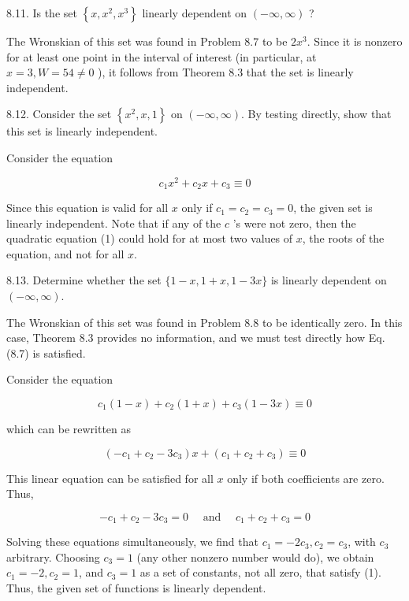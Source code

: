 \documentclass[10pt]{article}
\begin{document}
8.11. Is the set $\left\{x, x^{2}, x^{3}\right\}$ linearly dependent on $(-\infty, \infty)$ ?

The Wronskian of this set was found in Problem 8.7 to be $2 x^{3}$. Since it is nonzero for at least one point in the interval of interest (in particular, at $x=3, W=54 \neq 0$ ), it follows from Theorem 8.3 that the set is linearly independent.

8.12. Consider the set $\left\{x^{2}, x, 1\right\}$ on $(-\infty, \infty)$. By testing directly, show that this set is linearly independent.

Consider the equation


\begin{equation*}
c_{1} x^{2}+c_{2} x+c_{3} \equiv 0 \tag{1}
\end{equation*}


Since this equation is valid for all $x$ only if $c_{1}=c_{2}=c_{3}=0$, the given set is linearly independent. Note that if any of the $c$ 's were not zero, then the quadratic equation (1) could hold for at most two values of $x$, the roots of the equation, and not for all $x$.

8.13. Determine whether the set $\{1-x, 1+x, 1-3 x\}$ is linearly dependent on $(-\infty, \infty)$.

The Wronskian of this set was found in Problem 8.8 to be identically zero. In this case, Theorem 8.3 provides no information, and we must test directly how Eq. (8.7) is satisfied.

Consider the equation


\begin{equation*}
c_{1}(1-x)+c_{2}(1+x)+c_{3}(1-3 x) \equiv 0 \tag{1}
\end{equation*}


which can be rewritten as

$$
\left(-c_{1}+c_{2}-3 c_{3}\right) x+\left(c_{1}+c_{2}+c_{3}\right) \equiv 0
$$

This linear equation can be satisfied for all $x$ only if both coefficients are zero. Thus,

$$
-c_{1}+c_{2}-3 c_{3}=0 \quad \text { and } \quad c_{1}+c_{2}+c_{3}=0
$$

Solving these equations simultaneously, we find that $c_{1}=-2 c_{3}, c_{2}=c_{3}$, with $c_{3}$ arbitrary. Choosing $c_{3}=1$ (any other nonzero number would do), we obtain $c_{1}=-2, c_{2}=1$, and $c_{3}=1$ as a set of constants, not all zero, that satisfy (1). Thus, the given set of functions is linearly dependent.
\end{document}
